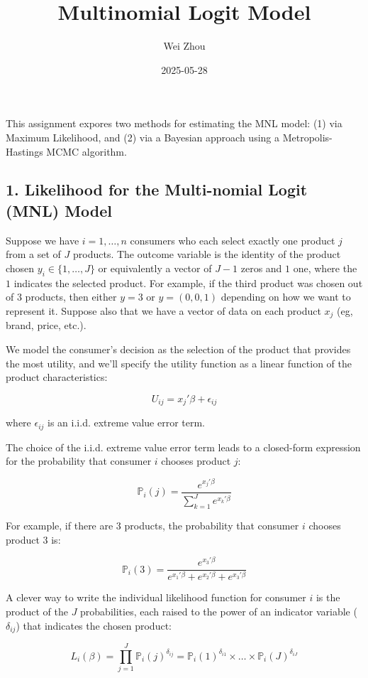 \documentclass[
  letterpaper,
  DIV=11,
  numbers=noendperiod]{scrartcl}
\title{Multinomial Logit Model}
\author{Wei Zhou}
\date{2025-05-28}
\begin{document}
\maketitle


This assignment expores two methods for estimating the MNL model: (1)
via Maximum Likelihood, and (2) via a Bayesian approach using a
Metropolis-Hastings MCMC algorithm.

\subsection{1. Likelihood for the Multi-nomial Logit (MNL)
Model}\label{likelihood-for-the-multi-nomial-logit-mnl-model}

Suppose we have \(i=1,\ldots,n\) consumers who each select exactly one
product \(j\) from a set of \(J\) products. The outcome variable is the
identity of the product chosen \(y_i \in \{1, \ldots, J\}\) or
equivalently a vector of \(J-1\) zeros and \(1\) one, where the \(1\)
indicates the selected product. For example, if the third product was
chosen out of 3 products, then either \(y=3\) or \(y=(0,0,1)\) depending
on how we want to represent it. Suppose also that we have a vector of
data on each product \(x_j\) (eg, brand, price, etc.).

We model the consumer's decision as the selection of the product that
provides the most utility, and we'll specify the utility function as a
linear function of the product characteristics:

\[ U_{ij} = x_j'\beta + \epsilon_{ij} \]

where \(\epsilon_{ij}\) is an i.i.d. extreme value error term.

The choice of the i.i.d. extreme value error term leads to a closed-form
expression for the probability that consumer \(i\) chooses product
\(j\):

\[ \mathbb{P}_i(j) = \frac{e^{x_j'\beta}}{\sum_{k=1}^Je^{x_k'\beta}} \]

For example, if there are 3 products, the probability that consumer
\(i\) chooses product 3 is:

\[ \mathbb{P}_i(3) = \frac{e^{x_3'\beta}}{e^{x_1'\beta} + e^{x_2'\beta} + e^{x_3'\beta}} \]

A clever way to write the individual likelihood function for consumer
\(i\) is the product of the \(J\) probabilities, each raised to the
power of an indicator variable (\(\delta_{ij}\)) that indicates the
chosen product:

\[ L_i(\beta) = \prod_{j=1}^J \mathbb{P}_i(j)^{\delta_{ij}} = \mathbb{P}_i(1)^{\delta_{i1}} \times \ldots \times \mathbb{P}_i(J)^{\delta_{iJ}}\]
\end{document}
